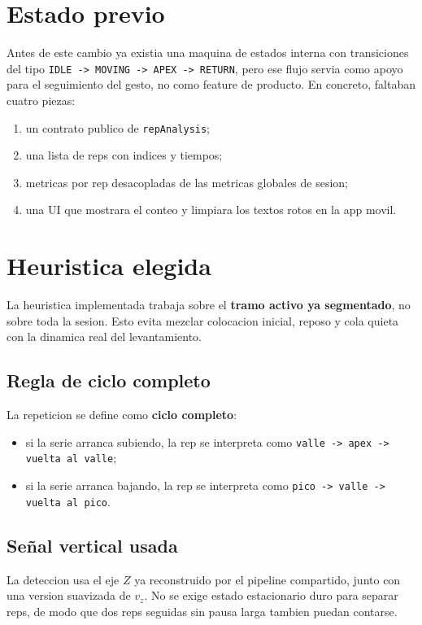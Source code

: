 \documentclass[11pt,a4paper]{article}
\begin{document}
\section{Estado previo}
Antes de este cambio ya existia una maquina de estados interna con transiciones del tipo \texttt{IDLE -> MOVING -> APEX -> RETURN}, pero ese flujo servia como apoyo para el seguimiento del gesto, no como feature de producto. En concreto, faltaban cuatro piezas:
\begin{enumerate}[leftmargin=16pt]
  \item un contrato publico de \texttt{repAnalysis};
  \item una lista de reps con indices y tiempos;
  \item metricas por rep desacopladas de las metricas globales de sesion;
  \item una UI que mostrara el conteo y limpiara los textos rotos en la app movil.
\end{enumerate}

\section{Heuristica elegida}
La heuristica implementada trabaja sobre el \textbf{tramo activo ya segmentado}, no sobre toda la sesion. Esto evita mezclar colocacion inicial, reposo y cola quieta con la dinamica real del levantamiento.

\subsection*{Regla de ciclo completo}
La repeticion se define como \textbf{ciclo completo}:
\begin{itemize}[leftmargin=14pt]
  \item si la serie arranca subiendo, la rep se interpreta como \texttt{valle -> apex -> vuelta al valle};
  \item si la serie arranca bajando, la rep se interpreta como \texttt{pico -> valle -> vuelta al pico}.
\end{itemize}

\subsection*{Señal vertical usada}
La deteccion usa el eje \(Z\) ya reconstruido por el pipeline compartido, junto con una version suavizada de \(v_z\). No se exige estado estacionario duro para separar reps, de modo que dos reps seguidas sin pausa larga tambien puedan contarse.
\end{document}
